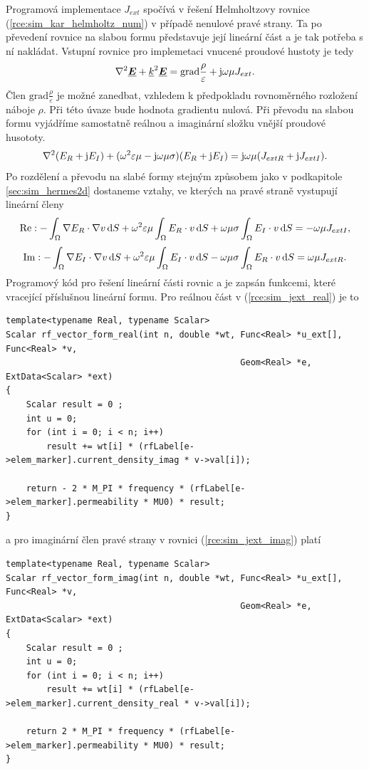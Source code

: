 Programová implementace $J_{ext}$ spočívá v řešení Helmholtzovy rovnice (\ref{rce:sim_kar_helmholtz_num}) v případě nenulové pravé strany. Ta po převedení rovnice na slabou formu představuje její lineární část a je tak potřeba s ní nakládat. Vstupní rovnice pro implemetaci vnucené proudové hustoty je tedy
\begin{displaymath}
	\nabla^{2}\mbox{\underline{\boldmath$E$}} +{\underline{k}}^{2}\mbox{\underline{\boldmath$E$}} = \mathrm{grad}\frac{\rho}{\varepsilon} + \mathrm{j}\omega\mu J_{ext}.
\end{displaymath}
Člen $\mathrm{grad}\frac{\rho}{\varepsilon}$ je možné zanedbat, vzhledem k předpokladu rovnoměrného rozložení náboje $\rho$. Při této úvaze bude hodnota gradientu nulová. Při převodu na slabou formu vyjádříme samostatně reálnou a imaginární složku vnější proudové husototy.
\begin{displaymath}
	\nabla^{2}(E_R + \mathrm{j} E_I) + (\omega^{2}\varepsilon\mu - \mathrm{j}\omega\mu\sigma)(E_R + \mathrm{j} E_I) = \mathrm{j}\omega\mu (J_{ext R} + \mathrm{j} J_{ext I}). 
\end{displaymath}
Po rozdělení a převodu na slabé formy stejným způsobem jako v podkapitole \ref{sec:sim_hermes2d} dostaneme vztahy, ve kterých na pravé straně vystupují lineární členy 
\begin{equation}
	\mathrm{Re} : -\int_{\Omega}\nabla E_R\cdot\nabla v \,\mathrm{d} S + \omega^{2}\varepsilon\mu\int_{\Omega} E_R\cdot v\,\mathrm{d} S + \omega\mu\sigma\int_{\Omega} E_I\cdot v\,\mathrm{d} S = -\omega\mu J_{ext I},
	\label{rce:sim_jext_real} 
\end{equation}
\begin{equation}
	\mathrm{Im} : -\int_{\Omega}\nabla E_I\cdot\nabla v\,\mathrm{d} S + \omega^{2}\varepsilon\mu\int_{\Omega} E_I\cdot v\,\mathrm{d} S - \omega\mu\sigma\int_{\Omega} E_R\cdot v\,\mathrm{d} S = \omega\mu J_{ext R}.
	\label{rce:sim_jext_imag} 
\end{equation}
Programový kód pro řešení lineární části rovnic a je zapsán funkcemi, které vracející příslušnou lineární formu. Pro reálnou část v (\ref{rce:sim_jext_real}) je to
\begin{verbatim}
template<typename Real, typename Scalar>
Scalar rf_vector_form_real(int n, double *wt, Func<Real> *u_ext[], Func<Real> *v,
                                              Geom<Real> *e, ExtData<Scalar> *ext)
{
    Scalar result = 0 ;
    int u = 0;
    for (int i = 0; i < n; i++)
        result += wt[i] * (rfLabel[e->elem_marker].current_density_imag * v->val[i]);

    return - 2 * M_PI * frequency * (rfLabel[e->elem_marker].permeability * MU0) * result;
}
\end{verbatim}
a pro imaginární člen pravé strany v rovnici (\ref{rce:sim_jext_imag}) platí
\begin{verbatim}
template<typename Real, typename Scalar>
Scalar rf_vector_form_imag(int n, double *wt, Func<Real> *u_ext[], Func<Real> *v,
                                              Geom<Real> *e, ExtData<Scalar> *ext)
{
    Scalar result = 0 ;
    int u = 0;
    for (int i = 0; i < n; i++)
        result += wt[i] * (rfLabel[e->elem_marker].current_density_real * v->val[i]);

    return 2 * M_PI * frequency * (rfLabel[e->elem_marker].permeability * MU0) * result;
}
\end{verbatim}


